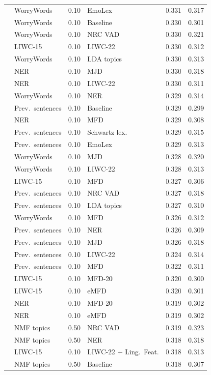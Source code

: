 {\begin{longtable}{llclcc}
 & WorryWords & 0.10 & EmoLex & 0.331 & 0.317 \\
 & WorryWords & 0.10 & Baseline & 0.330 & 0.301 \\
 & WorryWords & 0.10 & NRC VAD & 0.330 & 0.321 \\
 & LIWC-15 & 0.10 & LIWC-22 & 0.330 & 0.312 \\
 & WorryWords & 0.10 & LDA topics & 0.330 & 0.313 \\
 & NER & 0.10 & MJD & 0.330 & 0.318 \\
 & NER & 0.10 & LIWC-22 & 0.330 & 0.311 \\
 & WorryWords & 0.10 & NER & 0.329 & 0.314 \\
 & Prev.\ sentences & 0.10 & Baseline & 0.329 & 0.299 \\
 & NER & 0.10 & MFD & 0.329 & 0.308 \\
 & Prev.\ sentences & 0.10 & Schwartz lex. & 0.329 & 0.315 \\
 & Prev.\ sentences & 0.10 & EmoLex & 0.329 & 0.313 \\
 & WorryWords & 0.10 & MJD & 0.328 & 0.320 \\
 & WorryWords & 0.10 & LIWC-22 & 0.328 & 0.313 \\
 & LIWC-15 & 0.10 & MFD & 0.327 & 0.306 \\
 & Prev.\ sentences & 0.10 & NRC VAD & 0.327 & 0.318 \\
 & Prev.\ sentences & 0.10 & LDA topics & 0.327 & 0.310 \\
 & WorryWords & 0.10 & MFD & 0.326 & 0.312 \\
 & Prev.\ sentences & 0.10 & NER & 0.326 & 0.309 \\
 & Prev.\ sentences & 0.10 & MJD & 0.326 & 0.318 \\
 & Prev.\ sentences & 0.10 & LIWC-22 & 0.324 & 0.314 \\
 & Prev.\ sentences & 0.10 & MFD & 0.322 & 0.311 \\
 & LIWC-15 & 0.10 & MFD-20 & 0.320 & 0.300 \\
 & LIWC-15 & 0.10 & eMFD & 0.320 & 0.301 \\
 & NER & 0.10 & MFD-20 & 0.319 & 0.302 \\
 & NER & 0.10 & eMFD & 0.319 & 0.302 \\
 & NMF topics & 0.50 & NRC VAD & 0.319 & 0.323 \\
 & NMF topics & 0.50 & NER & 0.318 & 0.318 \\
 & LIWC-15 & 0.10 & LIWC-22 + Ling.\ Feat. & 0.318 & 0.313 \\
 & NMF topics & 0.50 & Baseline & 0.318 & 0.307 \\

\end{longtable}}
